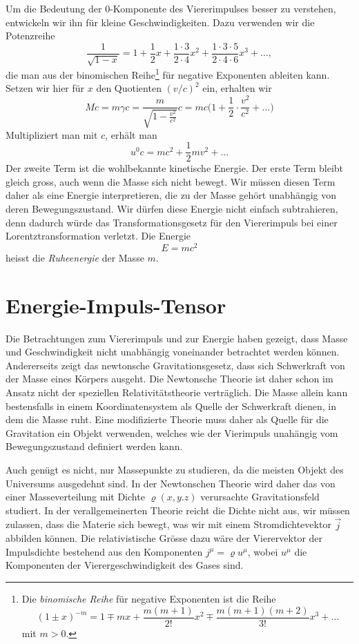Um die Bedeutung der $0$-Komponente des Viererimpulses besser zu
verstehen, entwickeln wir ihn für kleine Geschwindigkeiten.
Dazu verwenden wir die Potenzreihe
\[
\frac1{\sqrt{1-x}}
=
1+\frac12x+\frac{1\cdot 3}{2\cdot 4}x^2 + \frac{1\cdot 3\cdot 5}{2\cdot 4\cdot 6}x^3+\dots,
\]
die man aus der binomischen Reihe\footnote{%
Die {\em binomische Reihe} für negative Exponenten ist die Reihe
\[
(1\pm x)^{-m}
=
1\mp mx +\frac{m(m+1)}{2!}x^2 \mp \frac{m(m+1)(m+2)}{3!} x^3 +\dots
\]
mit $m>0$.
} für negative Exponenten ableiten kann.
Setzen wir hier für $x$ den Quotienten $(v/c)^2$ ein, erhalten wir
\[
Mc
=
m\gamma c
=
\frac{m}{\sqrt{1-\displaystyle\frac{v^2}{c^2}}} c
=
mc\biggl(1+\frac12\cdot\frac{v^2}{c^2}+\dots\biggl)
\]
Multipliziert man mit $c$, erhält man 
\[
u^0c = mc^2 + \frac12mv^2+\dots
\]
Der zweite Term ist die wohlbekannte kinetische Energie.
Der erste Term bleibt gleich gross, auch wenn die Masse sich
nicht bewegt.
Wir müssen diesen Term daher als eine Energie interpretieren, die
zu der Masse gehört unabhängig von deren Bewegungszustand.
Wir dürfen diese Energie nicht einfach subtrahieren, denn dadurch
würde das Transformationsgesetz für den Viererimpuls bei einer
Lorentztransformation verletzt.
Die Energie
\begin{equation}
E=mc^2
\label{E=mc2}
\end{equation}
heisst die {\em Ruheenergie} der Masse $m$.

\section{Energie-Impuls-Tensor}
Die Betrachtungen zum Viererimpuls und zur Energie haben gezeigt, dass
Masse und Geschwindigkeit nicht unabhängig voneinander betrachtet
werden können.
Andererseits zeigt das newtonsche Gravitationsgesetz, dass sich Schwerkraft
von der Masse eines Körpers ausgeht.
Die Newtonsche Theorie ist daher schon im Ansatz nicht der
speziellen Relativitätstheorie verträglich.
Die Masse allein kann bestensfalls in einem Koordinatensystem als
Quelle der Schwerkraft dienen, in dem die Masse ruht.
Eine modifizierte Theorie muss daher als Quelle für die Gravitation
ein Objekt verwenden, welches wie der Vierimpuls unahängig vom
Bewegungszustand definiert werden kann.

Auch genügt es nicht, nur Massepunkte zu studieren, da die meisten
Objekt des Universums ausgedehnt sind.
In der Newtonschen Theorie wird daher das von einer Masseverteilung mit
Dichte $\varrho(x,y.z)$ verursachte Gravitationsfeld studiert.
In der verallgemeinerten Theorie reicht die Dichte nicht aus,
wir müssen zulassen, dass die Materie sich bewegt, was wir mit einem
Stromdichtevektor $\vec j$ abbilden können.
Die relativistische Grösse dazu wäre der Vierervektor der Impulsdichte
bestehend aus den Komponenten $j^\mu=\varrho u^\mu$,
wobei $u^\mu$ die Komponenten der Vierergeschwindigkeit des Gases sind.

